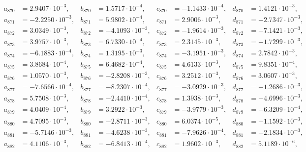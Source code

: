 \begin{align*}
  a_{ 870 } &= 2.9407 \cdot 10^{ -3 }, & b_{ 870 } &= 1.5717 \cdot 10^{ -4 }, & c_{ 870 } &= -1.1433 \cdot 10^{ -4 }, & d_{ 870 } &= 1.4121 \cdot 10^{ -3 }, \\ 
  a_{ 871 } &= -2.2250 \cdot 10^{ -3 }, & b_{ 871 } &= 5.9802 \cdot 10^{ -4 }, & c_{ 871 } &= 2.9006 \cdot 10^{ -3 }, & d_{ 871 } &= -2.7347 \cdot 10^{ -3 }, \\ 
  a_{ 872 } &= 3.0349 \cdot 10^{ -3 }, & b_{ 872 } &= -4.1093 \cdot 10^{ -3 }, & c_{ 872 } &= -1.9614 \cdot 10^{ -3 }, & d_{ 872 } &= -7.1421 \cdot 10^{ -3 }, \\ 
  a_{ 873 } &= 3.9757 \cdot 10^{ -3 }, & b_{ 873 } &= 6.7330 \cdot 10^{ -4 }, & c_{ 873 } &= 2.3145 \cdot 10^{ -3 }, & d_{ 873 } &= -1.7299 \cdot 10^{ -3 }, \\ 
  a_{ 874 } &= -6.1883 \cdot 10^{ -4 }, & b_{ 874 } &= 1.3195 \cdot 10^{ -3 }, & c_{ 874 } &= -3.1951 \cdot 10^{ -3 }, & d_{ 874 } &= 2.7842 \cdot 10^{ -3 }, \\ 
  a_{ 875 } &= 3.8684 \cdot 10^{ -4 }, & b_{ 875 } &= 6.4682 \cdot 10^{ -4 }, & c_{ 875 } &= 4.6133 \cdot 10^{ -3 }, & d_{ 875 } &= 9.8351 \cdot 10^{ -4 }, \\ 
  a_{ 876 } &= 1.0570 \cdot 10^{ -3 }, & b_{ 876 } &= -2.8208 \cdot 10^{ -3 }, & c_{ 876 } &= 3.2512 \cdot 10^{ -3 }, & d_{ 876 } &= 3.0607 \cdot 10^{ -3 }, \\ 
  a_{ 877 } &= -7.6566 \cdot 10^{ -4 }, & b_{ 877 } &= -8.2307 \cdot 10^{ -4 }, & c_{ 877 } &= -3.0929 \cdot 10^{ -3 }, & d_{ 877 } &= -1.2686 \cdot 10^{ -3 }, \\ 
  a_{ 878 } &= 5.7508 \cdot 10^{ -3 }, & b_{ 878 } &= -2.4410 \cdot 10^{ -4 }, & c_{ 878 } &= 1.3938 \cdot 10^{ -3 }, & d_{ 878 } &= -4.6996 \cdot 10^{ -3 }, \\ 
  a_{ 879 } &= 4.0409 \cdot 10^{ -4 }, & b_{ 879 } &= 3.2922 \cdot 10^{ -3 }, & c_{ 879 } &= -3.9779 \cdot 10^{ -3 }, & d_{ 879 } &= -6.3209 \cdot 10^{ -4 }, \\ 
  a_{ 880 } &= 4.7095 \cdot 10^{ -3 }, & b_{ 880 } &= -2.8711 \cdot 10^{ -3 }, & c_{ 880 } &= 6.0374 \cdot 10^{ -5 }, & d_{ 880 } &= -1.1592 \cdot 10^{ -3 }, \\ 
  a_{ 881 } &= -5.7146 \cdot 10^{ -3 }, & b_{ 881 } &= -4.6238 \cdot 10^{ -3 }, & c_{ 881 } &= -7.9626 \cdot 10^{ -4 }, & d_{ 881 } &= -2.1834 \cdot 10^{ -3 }, \\ 
  a_{ 882 } &= 4.1106 \cdot 10^{ -3 }, & b_{ 882 } &= -6.8413 \cdot 10^{ -4 }, & c_{ 882 } &= 1.9602 \cdot 10^{ -3 }, & d_{ 882 } &= 5.1189 \cdot 10^{ -6 }, \\ 

\end{align*}
